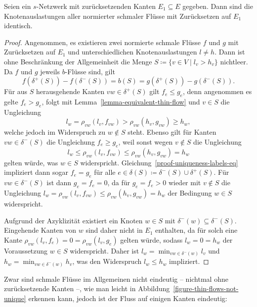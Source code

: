 \begin{lemma}\label{lemma-node-congestion-unique}
	Seien ein $s$-Netzwerk mit zurücksetzenden Kanten $E_1\subseteq E$ gegeben.
	Dann sind die Knotenauslastungen aller normierter schmaler Flüsse mit Zurücksetzen auf $E_1$ identisch.
\end{lemma}
\begin{proof}
	Angenommen, es existieren zwei normierte schmale Flüsse $f$ und $g$ mit Zurück\-setzen auf $E_1$ und unterschiedlichen Knotenauslastungen $l\neq h$.
	Dann ist ohne Beschränkung der Allgemeinheit die Menge $S\coloneq \{ v\in V \mid l_v > h_v \}$ nichtleer.
	Da $f$ und $g$ jeweils $b$-Flüsse sind, gilt 
	\begin{equation}\label{proof-uniqueness-labels-eq}
	f( \delta^+(S)) - f(\delta^-(S)) = b(S) = g(\delta^+(S)) - g(\delta^-(S)).
	\end{equation}
	Für aus $S$ herausgehende Kanten $vw\in \delta^+(S)$ gilt $f_e \leq g_e$, denn angenommen es gelte $f_e > g_e$, folgt mit Lemma~\ref{lemma-equivalent-thin-flow} und $v\in S$ die Ungleichung 
	\[l_w = \rho_{vw}(l_v, f_{vw}) > \rho_{vw}(h_v, g_{vw})\geq h_w,\]
	welche jedoch im Widerspruch zu $w\notin S$ steht.
	Ebenso gilt für Kanten $vw\in\delta^-(S)$ die Ungleichung $f_e \geq g_e$, weil sonst wegen $v\notin S$ die Ungleichung
	\[l_w \leq \rho_{vw}(l_v, f_{vw}) \leq \rho_{vw}(h_v, g_{vw}) = h_w\]
	gelten würde, was $w\in S$ widerspricht.
	Gleichung~\ref{proof-uniqueness-labels-eq} impliziert dann sogar $f_e = g_e$ für alle $e\in \delta(S)\coloneq \delta^-(S) \cup \delta^+(S)$.
	Für $vw\in \delta^-(S)$ ist dann $g_e=f_e=0$, da für $g_e=f_e>0$ wieder mit $v\notin S$ die Ungleichung $l_w = \rho_{vw}(l_v, f_{vw})\leq \rho_{vw}(h_v, g_{vw})=h_w$ der Bedingung $w\in S$ widerspricht.
	
	Aufgrund der Azyklizität existiert ein Knoten $w\in S$ mit $\delta^-(w)\subseteq \delta^-(S)$.
	Eingehende Kanten von $w$ sind daher nicht in $E_1$ enthalten, da für solch eine Kante $\rho_{vw}(l_v, f_e) = 0 = \rho_{vw}(l_v, g_e)$ gelten würde, sodass $l_w = 0 = h_w$ der Voraussetzung $w\in S$ widerspricht.
	Daher ist $l_w = \min_{vw\in \delta^-(w)} l_v$ und $h_w = \min_{vw\in\delta^-(w)} h_v$, was den Widerspruch $l_w \leq h_w$ impliziert.
\end{proof}

Zwar sind schmale Flüsse im Allgemeinen nicht eindeutig -- nichtmal ohne zurück\-setzende Kanten --, wie man leicht in Abbildung~\ref{figure-thin-flows-not-unique} erkennen kann, jedoch ist der Fluss auf einigen Kanten eindeutig:


